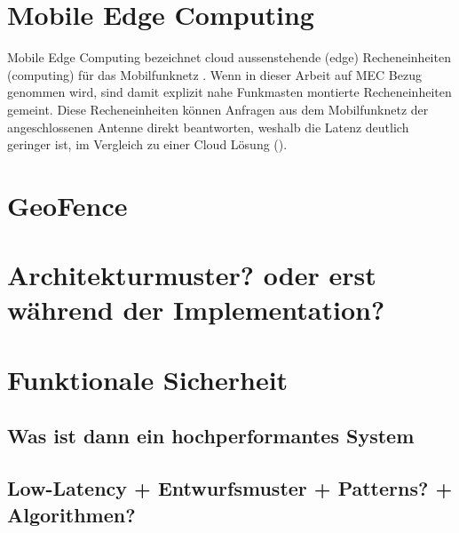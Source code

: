 \section{Mobile Edge Computing}

Mobile Edge Computing bezeichnet cloud aussenstehende (edge) Recheneinheiten (computing) für das Mobilfunknetz .
Wenn in dieser Arbeit auf MEC Bezug genommen wird, sind damit explizit nahe Funkmasten montierte Recheneinheiten gemeint.
Diese Recheneinheiten können Anfragen aus dem Mobilfunknetz der angeschlossenen Antenne direkt beantworten, weshalb die Latenz deutlich geringer ist, im Vergleich zu einer Cloud Lösung ().


\section{GeoFence}


\section{Architekturmuster? oder erst während der Implementation?}



			
		\section{Funktionale Sicherheit}
			\label{com:safety}
			
		\subsection{Was ist dann ein hochperformantes System}
		\subsection{Low-Latency + Entwurfsmuster + Patterns? + Algorithmen?}
			
			
			
			
